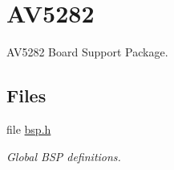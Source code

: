 \hypertarget{group__RTEMSBSPsM68kAV5282}{}\section{A\+V5282}
\label{group__RTEMSBSPsM68kAV5282}


A\+V5282 Board Support Package.  


\subsection*{Files}
\begin{DoxyCompactItemize}
\item 
file \mbox{\hyperlink{bsps_2m68k_2av5282_2include_2bsp_8h}{bsp.\+h}}
\begin{DoxyCompactList}\small\item\em Global B\+SP definitions. \end{DoxyCompactList}\end{DoxyCompactItemize}
